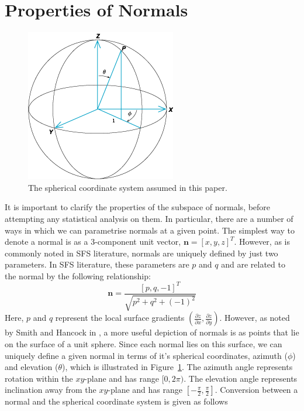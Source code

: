 \section{Properties of Normals}\label{sec:properties-of-normals}
\begin{figure}[t]
    \centering
    \includegraphics[width=0.6\columnwidth]{images/spherical-coordinates}
    \caption{The spherical coordinate system assumed in this paper.}
    \label{fig:spherical-coordinates}
\end{figure}
It is important to clarify the properties of the subspace of normals, before attempting any statistical analysis on them. In particular, there are a number of ways in which we can parametrise normals at a given point. The simplest way to denote a normal is as a 3-component unit vector, $\boldsymbol{n} = [x, y, z]^T$. However, as is commonly noted in SFS literature, normals are uniquely defined by just two parameters. In SFS literature, these parameters are $p$ and $q$ and are related to the normal by the following relationship:
\begin{equation}\label{eq:pq-representation}
    \boldsymbol{n} = \frac{[p, q, -1]^T}{\sqrt{p^2 + q^2 + (-1)^2}}
\end{equation}
Here, $p$ and $q$ represent the local surface gradients $\left( \frac{\partial z}{\partial x}, \frac{\partial z}{\partial y} \right)$. However, as noted by Smith and Hancock in \cite{RefWorks:90}, a more useful depiction of normals is as points that lie on the surface of a unit sphere. Since each normal lies on this surface, we can uniquely define a given normal in terms of it's spherical coordinates, azimuth ($\phi$) and elevation ($\theta$), which is illustrated in Figure~\ref{fig:spherical-coordinates}. The azimuth angle represents rotation within the $xy$-plane and has range $[0, 2 \pi)$. The elevation angle represents inclination away from the $xy$-plane and has range $[-\frac{\pi}{2}, \frac{\pi}{2}]$. Conversion between a normal and the spherical coordinate system is given as follows

